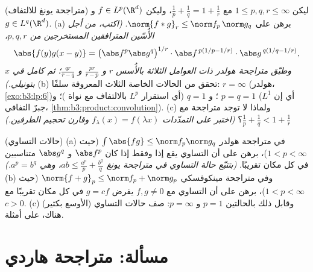 \begin{exercise}[$\star\star\star$]\label{exo:b3:lp:11}
(متراجحة يونغ للالتفاف) ليكن $1 \leq p, q, r \leq
\infty$ مع $\frac1p + \frac1q = 1 + \frac1r$، وليكن $f \in
L^p(\R^d)$
و $g \in L^q(\R^d)$.
(a) برهن على $\norm{f * g}_r \leq \norm f_p\,\norm g_q$.
\emph{(اكتب، من أجل الأُسّين المترافقين المستخرجين من $p, q,
r$،
\[
\abs{f(y)g(x-y)} = \bigl(\abs f^p\abs g^q\bigr)^{1/r}
\cdot\abs f^{\,p(1/p - 1/r)}\cdot\abs g^{\,q(1/q - 1/r)},
\]
وطبّق متراجحة هولدر ذات العوامل الثلاثة بالأُسس $r$ و $\frac{pr}{r - p}$
و $\frac{qr}{r - q}$؛ ثم كامل في $x$ بتونيلي.)}
(b) تحقق من الحالات الخاصة الثلاث المعروفة سلفًا: $r =
\infty$
(هولدر، \cref{exo:b3:lp:6})؛ و $q = 1$ (أي استقرار $L^p$ بالالتفاف مع
نواة )؛ و $p = q = 1$ (أي إن $L^1$ جبرٌ التفافي،
\cref{thm:b3:product:convolution}).
(c) ولماذا لا توجد متراجحة مع $\frac1p + \frac1q < 1 +
\frac1r$؟ \emph{(اختبر على
التمدّدات $f_\lambda(x) =
f(\lambda x)$ وقارن تحجيم الطرفين.)}
\end{exercise}

\begin{exercise}[$\star\star$]\label{exo:b3:lp:12}
(حالات التساوي) (a) في متراجحة هولدر $\int\abs{fg} \leq \norm f_p\norm g_q$ (حيث
$1 < p < \infty$)، برهن على أن التساوي يقع إذا وفقط إذا كان
$\abs f^p$ و $\abs g^q$ متناسبين في كل مكان تقريبًا.
\emph{(بتتبّع حالة التساوي في متراجحة يونغ $ab \leq \frac{a^p}p + \frac{b^q}q$، وهي
$a^p
= b^q$.)}
(b) وفي متراجحة مينكوفسكي $\norm{f + g}_p \leq \norm f_p
+ \norm g_p$ (حيث $1 < p < \infty$)، برهن
على أن التساوي مع $f,
g \neq 0$ يفرض $g = cf$ في كل مكان تقريبًا مع
$c > 0$.
(c) وقابل ذلك بالحالتين $p = 1$ و $p = \infty$: صف حالات
التساوي (الأوسع بكثير) هناك، على أمثلة.
\end{exercise}

\section{مسألة: متراجحة هاردي}

